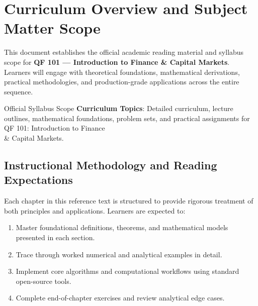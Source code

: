 \section{Curriculum Overview and Subject Matter Scope}

This document establishes the official academic reading material and syllabus scope for \textbf{QF 101 --- Introduction to Finance \& Capital Markets}. Learners will engage with theoretical foundations, mathematical derivations, practical methodologies, and production-grade applications across the entire sequence.

\begin{InsightBox}{Official Syllabus Scope}
  \textbf{Curriculum Topics}: Detailed curriculum, lecture outlines, mathematical foundations, problem sets, and practical assignments for QF 101: Introduction to Finance \\& Capital Markets.
\end{InsightBox}

\subsection{Instructional Methodology and Reading Expectations}

Each chapter in this reference text is structured to provide rigorous treatment of both principles and applications. Learners are expected to:
\begin{enumerate}
  \item Master foundational definitions, theorems, and mathematical models presented in each section.
  \item Trace through worked numerical and analytical examples in detail.
  \item Implement core algorithms and computational workflows using standard open-source tools.
  \item Complete end-of-chapter exercises and review analytical edge cases.
\end{enumerate}


